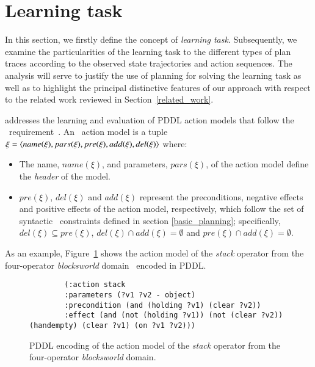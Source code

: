 
\section{Learning task}
\label{task_definition}

In this section, we firstly define the concept of \emph{learning task}. Subsequently, we examine the particularities of the learning task to the different types of plan traces according to the observed state trajectories and action sequences. The analysis will serve to justify the use of planning for solving the learning task as well as to highlight the principal distinctive features of our approach \FAMA with respect to the related work reviewed in Section~\ref{related_work}.

\vspace{0.1cm}

\FAMA addresses the learning and evaluation of PDDL action models that follow the \strips\ requirement~\cite{mcdermott1998pddl,fox2003pddl2}. An \strips\ action model is a tuple $\xi={\langle name(\xi),pars(\xi),pre(\xi),add(\xi),del(\xi) \rangle}$ where:

\begin{itemize}
	\item The name, $name(\xi)$, and parameters, $pars(\xi)$, of the action model define the {\em header} of the model.
	\item $pre(\xi)$, $del(\xi)$ and $add(\xi)$ represent the preconditions, negative effects and positive effects of the action model, respectively, \textcolor[rgb]{1.00,0.00,0.00}{which follow the set of syntactic \strips\ constraints defined in section \ref{basic_planning}; specifically,} $del(\xi)\subseteq pre(\xi)$, $del(\xi)\cap add(\xi)=\emptyset$ and $pre(\xi)\cap add(\xi)=\emptyset$.
\end{itemize}


As an example, Figure~\ref{fig:stack} shows the action model of the {\em stack} operator from the four-operator {\em blocksworld} domain~\cite{slaney2001blocks} encoded in PDDL.

\begin{figure}[hbt!]
	\begin{footnotesize}
		\begin{verbatim}
		(:action stack
		:parameters (?v1 ?v2 - object)
		:precondition (and (holding ?v1) (clear ?v2))
		:effect (and (not (holding ?v1)) (not (clear ?v2)) (handempty) (clear ?v1) (on ?v1 ?v2)))
		\end{verbatim}
	\end{footnotesize}
	\caption{PDDL encoding of the action model of the {\em stack} operator from the four-operator {\em blocksworld} domain.}
	\label{fig:stack}
\end{figure}


